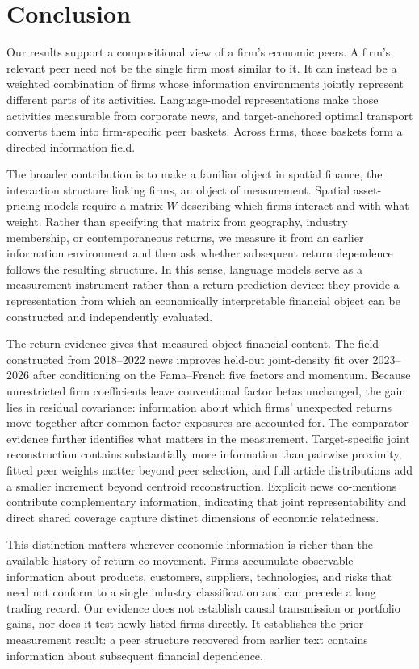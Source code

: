 \section{Conclusion}\label{sec:conclusion}

Our results support a compositional view of a firm's economic peers.
A firm's relevant peer need not be the single firm most similar to it.
It can instead be a weighted combination of firms whose information
environments jointly represent different parts of its activities.
Language-model representations make those activities measurable from corporate
news, and target-anchored optimal transport converts them into firm-specific
peer baskets.
Across firms, those baskets form a directed information field.

The broader contribution is to make a familiar object in spatial finance, the
interaction structure linking firms, an object of measurement.
Spatial asset-pricing models require a matrix $W$ describing which firms
interact and with what weight.
Rather than specifying that matrix from geography, industry membership, or
contemporaneous returns, we measure it from an earlier information environment
and then ask whether subsequent return dependence follows the resulting
structure.
In this sense, language models serve as a measurement instrument rather than a
return-prediction device: they provide a representation from which an
economically interpretable financial object can be constructed and
independently evaluated.

The return evidence gives that measured object financial content.
The field constructed from 2018--2022 news improves held-out joint-density fit
over 2023--2026 after conditioning on the Fama--French five factors and
momentum.
Because unrestricted firm coefficients leave conventional factor betas
unchanged, the gain lies in residual covariance: information about which firms'
unexpected returns move together after common factor exposures are accounted
for.
The comparator evidence further identifies what matters in the measurement.
Target-specific joint reconstruction contains substantially more information
than pairwise proximity, fitted peer weights matter beyond peer selection, and
full article distributions add a smaller increment beyond centroid
reconstruction.
Explicit news co-mentions contribute complementary information, indicating
that joint representability and direct shared coverage capture distinct
dimensions of economic relatedness.

This distinction matters wherever economic information is richer than the
available history of return co-movement.
Firms accumulate observable information about products, customers, suppliers,
technologies, and risks that need not conform to a single industry
classification and can precede a long trading record.
Our evidence does not establish causal transmission or portfolio gains, nor
does it test newly listed firms directly.
It establishes the prior measurement result: a peer structure recovered from
earlier text contains information about subsequent financial dependence.

